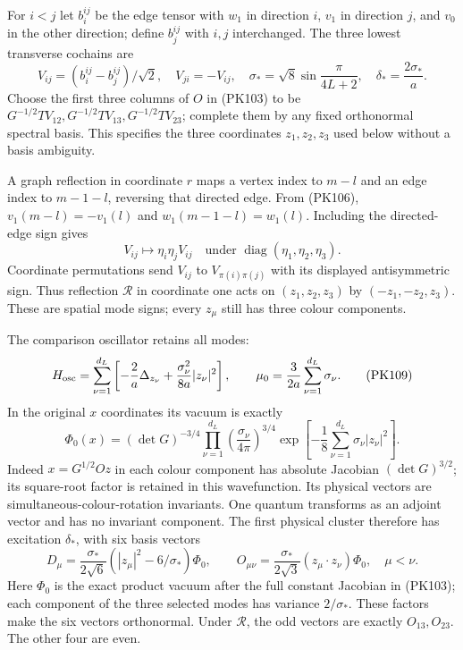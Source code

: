 \documentclass[11pt]{article}
\begin{document}
For \(i<j\) let \(b_i^{ij}\) be the edge tensor with \(w_1\) in
direction \(i\), \(v_1\) in direction \(j\), and \(v_0\) in the other
direction; define \(b_j^{ij}\) with \(i,j\) interchanged. The three
lowest transverse cochains are
\[
 V_{ij}=(b_i^{ij}-b_j^{ij})/\sqrt2,\quad
 V_{ji}=-V_{ij},\quad
 \sigma_*=\sqrt8\sin\frac{\pi}{4L+2},\quad
 \delta_*=\frac{2\sigma_*}{a}.
 \tag{PK107}
\]
Choose the first three columns of \(O\) in (PK103) to be
\(G^{-1/2}TV_{12},G^{-1/2}TV_{13},G^{-1/2}TV_{23}\);
complete them by any fixed orthonormal spectral basis. This specifies
the three coordinates \(z_1,z_2,z_3\) used below without a basis ambiguity.

A graph reflection in coordinate \(r\) maps a vertex index to \(m-l\)
and an edge index to \(m-1-l\), reversing that directed edge. From
(PK106), \(v_1(m-l)=-v_1(l)\) and \(w_1(m-1-l)=w_1(l)\).
Including the directed-edge sign gives
\[
 V_{ij}\longmapsto\eta_i\eta_jV_{ij}
 \quad\text{under }\operatorname{diag}(\eta_1,\eta_2,\eta_3).
 \tag{PK108}
\]
Coordinate permutations send \(V_{ij}\) to \(V_{\pi(i)\pi(j)}\)
with its displayed antisymmetric sign. Thus reflection \(\mathcal R\)
in coordinate one acts on \((z_1,z_2,z_3)\) by \((-z_1,-z_2,z_3)\).
These are spatial mode signs; every \(z_\mu\) still has three colour
components.

The comparison oscillator retains all modes:
\[
 H_{\rm osc}
 =\sum_{\nu=1}^{d_L}
   \left[-\frac2a\Delta_{z_\nu}
                  +\frac{\sigma_\nu^2}{8a}|z_\nu|^2\right],
 \qquad \mu_0=\frac3{2a}\sum_{\nu=1}^{d_L}\sigma_\nu .
 \tag{PK109}
\]
In the original \(x\) coordinates its vacuum is exactly
\[
 \Phi_0(x)=(\det G)^{-3/4}
     \prod_{\nu=1}^{d_L}\left(\frac{\sigma_\nu}{4\pi}\right)^{3/4}
     \exp\!\left[-\frac18\sum_{\nu=1}^{d_L}
                                  \sigma_\nu|z_\nu|^2\right].
 \tag{PK109a}
\]
Indeed \(x=G^{1/2}Oz\) in each colour component has absolute Jacobian
\((\det G)^{3/2}\); its square-root factor is retained in this
wavefunction. Its physical vectors are simultaneous-colour-rotation invariants.
One quantum transforms as an adjoint vector and has no invariant
component. The first physical cluster therefore has excitation
\(\delta_*\), with six basis vectors
\[
 D_\mu=\frac{\sigma_*}{2\sqrt6}
          (|z_\mu|^2-6/\sigma_*)\Phi_0,\qquad
 O_{\mu\nu}=\frac{\sigma_*}{2\sqrt3}
                    (z_\mu\cdot z_\nu)\Phi_0,\quad\mu<\nu .
 \tag{PK110}
\]
Here \(\Phi_0\) is the exact product vacuum after the full constant
Jacobian in (PK103); each component of the three selected modes has
variance \(2/\sigma_*\). These factors make the six vectors
orthonormal. Under \(\mathcal R\), the odd vectors are exactly
\(O_{13},O_{23}\). The other four are even.
\end{document}
